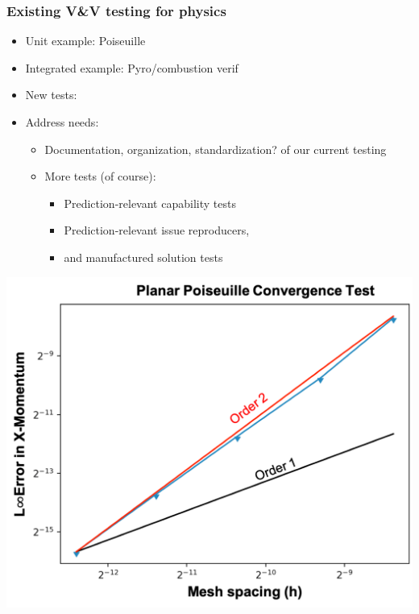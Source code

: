 \begin{frame}
\end{frame}

\begin{frame}\frametitle{Existing \mirgecom{} V\&V testing for physics}
\begin{multicols}{2}
\begin{itemize}
\item Unit example: Poiseuille
\item Integrated example: Pyro/combustion verif
\item New tests: 
\item Address needs:
      \begin{itemize}
      \item Documentation, organization, standardization? of our current testing
      \item More tests (of course):
            \begin{itemize}
            \item Prediction-relevant capability tests
            \item Prediction-relevant issue reproducers,
            \item and manufactured solution tests
            \end{itemize}
      \end{itemize}
\end{itemize}
\columnbreak
\includegraphics[width=.4\textwidth]{figures/PoiseuilleConvergence2.png}

\end{multicols}
\end{frame}
